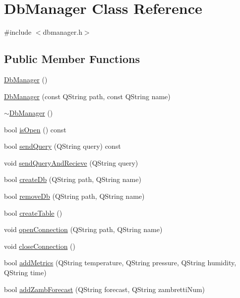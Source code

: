 \hypertarget{class_db_manager}{}\section{Db\+Manager Class Reference}
\label{class_db_manager}


{\ttfamily \#include $<$dbmanager.\+h$>$}

\subsection*{Public Member Functions}
\begin{DoxyCompactItemize}
\item 
\hyperlink{class_db_manager_a0d16cf5bba931362e6c581eb1b5ba66a}{Db\+Manager} ()
\item 
\hyperlink{class_db_manager_a6427aaa42f5f4da4e86c52c2fd258729}{Db\+Manager} (const Q\+String path, const Q\+String name)
\item 
\hyperlink{class_db_manager_ac5cdf8e5e932d1681ab807d8f256374c}{$\sim$\+Db\+Manager} ()
\item 
bool \hyperlink{class_db_manager_ac04baba8f5d5197f8bcd9230393501de}{is\+Open} () const
\item 
bool \hyperlink{class_db_manager_a9dc0b40635f274bfda0470ac6b8fdf8e}{send\+Query} (Q\+String query) const
\item 
void \hyperlink{class_db_manager_ac31abceb0dd13bd030fc293f5f88797a}{send\+Query\+And\+Recieve} (Q\+String query)
\item 
bool \hyperlink{class_db_manager_a6730317c113a14f24fee2fe144feadcc}{create\+Db} (Q\+String path, Q\+String name)
\item 
bool \hyperlink{class_db_manager_a152a22868c32afd49431495b0ed97d28}{remove\+Db} (Q\+String path, Q\+String name)
\item 
bool \hyperlink{class_db_manager_ac8c34581c717a41e7585a6dabceec002}{create\+Table} ()
\item 
void \hyperlink{class_db_manager_a0d30e17db55d9a545b648b58d38409b6}{open\+Connection} (Q\+String path, Q\+String name)
\item 
void \hyperlink{class_db_manager_acbf62228942a303d4b914475803319f4}{close\+Connection} ()
\item 
bool \hyperlink{class_db_manager_ac428e3219240fa0432d9b2a037d1d00c}{add\+Metrics} (Q\+String temperature, Q\+String pressure, Q\+String humidity, Q\+String time)
\item 
bool \hyperlink{class_db_manager_a43a28838e80ae08ee2379a9d2f971e21}{add\+Zamb\+Forecast} (Q\+String forecast, Q\+String zambretti\+Num)

\end{DoxyCompactItemize}
